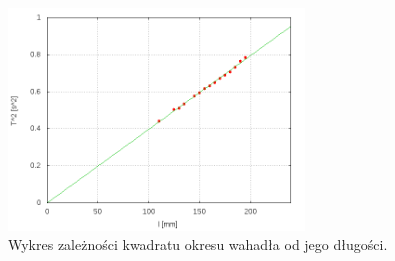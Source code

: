 \documentclass{article}
\begin{document}
	\begin{figure}[p]
		\centering
		\includegraphics[width=0.7\textwidth]{wykres_T2/wykres2.png}
		\caption{Wykres zależności kwadratu okresu wahadła od jego długości.}
		\label{wykres2}
	\end{figure}
	
\end{document}
